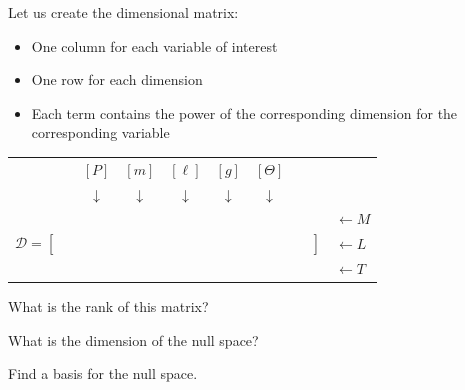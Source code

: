 \documentclass{workbook}
\begin{document}
\begin{slide}

\begin{parts}
\setcounter{partsitem}{1}

	\item Let us create the dimensional matrix:
	\begin{itemize}
		\item One column for each variable of interest
		\item One row for each dimension
		\item Each term contains the power of the corresponding dimension for the corresponding variable
	\end{itemize}
	
	\begin{center}
	\begin{tabular}{cccccccl}
		& $[P]$ & $[m]$ & $[\ell]$ & $[g]$ & $[\Theta]$ & \\
		& $\downarrow$ & $\downarrow$ & $\downarrow$ & $\downarrow$ & $\downarrow$ & \\
	\multirow{3}{*}{$\mathcal{D}=\left[\begin{matrix} \, \\ \,\\ \, \end{matrix}\right.$} 
		& & & & & & 
		\multirow{3}{*}{$\left.\begin{matrix} \, \\ \,\\ \, \end{matrix}\right]$}
		& $\leftarrow M$
		\\
		& & & & & & & $\leftarrow L$ \\
		& & & & & & & $\leftarrow T$
	\end{tabular}
	\end{center}
	
	\item What is the rank of this matrix?
	\item What is the dimension of the null space? %
	\item Find a basis for the null space.

\end{parts}

\end{slide}
\end{document}
